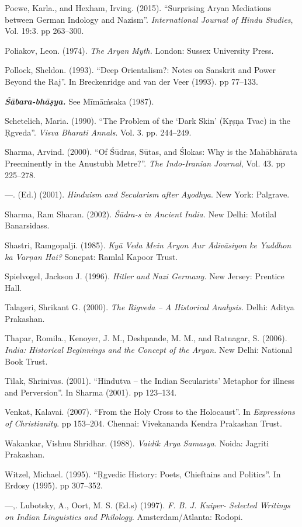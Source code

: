 \begin{thebibliography}{99}
  Poewe, Karla., and Hexham, Irving. (2015). “Surprising Aryan Mediations between German Indology and Nazism”. \textit{International Journal of Hindu Studies}, Vol. 19:3. pp 263--300.

  Poliakov, Leon. (1974). \textit{The Aryan Myth.} London: Sussex University Press.

  Pollock, Sheldon. (1993). “Deep Orientalism?: Notes on Sanskrit and Power Beyond the Raj”. In Breckenridge and van der Veer (1993)\textit{. }pp 77--133.

 \textbf{\textit{Śābara-bhāṣya.}} See Mīmāṁsaka (1987).

  Schetelich, Maria. (1990). “The Problem of the ‘Dark Skin’ (Kṛṣṇa Tvac) in the Ṛgveda”. \textit{Visva Bharati Annals}. Vol. 3. pp. 244--249.
 
  Sharma, Arvind. (2000). “Of Śūdras, Sūtas, and Ślokas: Why is the Mahābhārata Preeminently in the Anustubh Metre?”. \textit{The Indo-Iranian Journal}, Vol. 43. pp 225--278.

  —. (Ed.) (2001). \textit{Hinduism and Secularism after Ayodhya}. New York: Palgrave.

  Sharma, Ram Sharan. (2002). \textit{Śūdra-s in Ancient India.} New Delhi: Motilal Banarsidass.

  Shastri, Ramgopalji. (1985). \textit{Kyā Veda Mein Āryon Aur Ādivāsiyon ke Yuddhon ka Varṇan Hai?} Sonepat: Ramlal Kapoor Trust.

  Spielvogel, Jackson J. (1996). \textit{Hitler and Nazi Germany.} New Jersey: Prentice Hall.

  Talageri, Shrikant G. (2000). \textit{The Rigveda – A Historical Analysis.} Delhi: Aditya Prakashan.

  Thapar, Romila., Kenoyer, J. M., Deshpande, M. M., and Ratnagar, S. (2006). \textit{India: Historical Beginnings and the Concept of the Aryan. }New Delhi: National Book Trust.

  Tilak, Shrinivas. (2001). “Hindutva – the Indian Secularists’ Metaphor for illness and Perversion”. In Sharma (2001)\textit{.} pp 123--134.

  Venkat, Kalavai. (2007). “From the Holy Cross to the Holocaust”. In \textit{Expressions of Christianity}. pp 153--204. Chennai: Vivekananda Kendra Prakashan Trust.

  Wakankar, Vishnu Shridhar. (1988). \textit{Vaidik Arya Samasya}. Noida: Jagriti Prakashan.

  Witzel, Michael. (1995). “Ṛgvedic History: Poets, Chieftains and Politics”. In Erdosy (1995). pp 307--352.

  —,. Lubotsky, A., Oort, M. S. (Ed.s) (1997). \textit{F. B. J. Kuiper- Selected Writings on Indian Linguistics and Philology}. Amsterdam/Atlanta: Rodopi.

 \end{thebibliography}

\theendnotes

